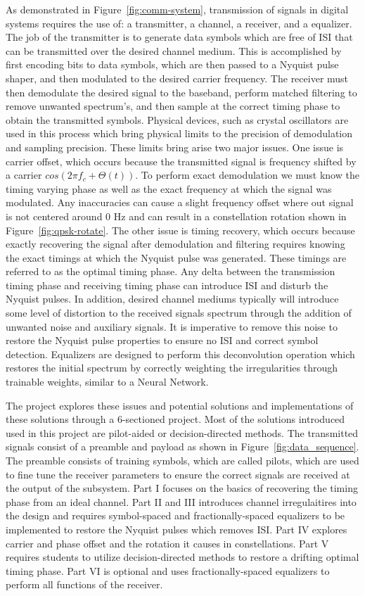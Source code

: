 As demonstrated in Figure~\ref{fig:comm-system}, transmission of signals in digital systems requires the use of: a transmitter, a channel, a receiver, and a equalizer. The job of the transmitter is to generate data symbols which are free of ISI that can be transmitted over the desired channel medium. This is accomplished by first encoding bits to data symbols, which are then passed to a Nyquist pulse shaper, and then modulated to the desired carrier frequency. The receiver must then demodulate the desired signal to the baseband, perform matched filtering to remove unwanted spectrum's, and then sample at the correct timing phase to obtain the transmitted symbols. Physical devices, such as crystal oscillators are used in this process which bring physical limits to the precision of demodulation and sampling precision. These limits bring arise two major issues. One issue is carrier offset, which occurs because the transmitted signal is frequency shifted by a carrier $cos(2\pi f_c + \Theta (t))$. To perform exact demodulation we must know the timing varying phase as well as the exact frequency at which the signal was modulated. Any inaccuracies can cause a slight frequency offset where out signal is not centered around 0 Hz and can result in a constellation rotation shown in Figure~\ref{fig:qpsk-rotate}. The other issue is timing recovery, which occurs because exactly recovering the signal after demodulation and filtering requires knowing the exact timings at which the Nyquist pulse was generated. These timings are referred to as the optimal timing phase. Any delta between the transmission timing phase and receiving timing phase can introduce ISI and disturb the Nyquist pulses.
In addition, desired channel mediums typically will introduce some level of distortion to the received signals spectrum through the addition of unwanted noise and auxiliary signals. It is imperative to remove this noise to restore the Nyquist pulse properties to ensure no ISI and correct symbol detection. Equalizers are designed to perform this deconvolution operation which restores the initial spectrum by correctly weighting the irregularities through trainable weights, similar to a Neural Network. 

The project explores these issues and potential solutions and implementations of these solutions through a 6-sectioned project. Most of the solutions introduced used in this project are pilot-aided or decision-directed methods. The transmitted signals consist of a preamble and payload as shown in Figure~\ref{fig:data_sequence}. The preamble consists of training symbols, which are called pilots, which are used to fine tune the receiver parameters to ensure the correct signals are received at the output of the subsystem. Part I focuses on the basics of recovering the timing phase from an ideal channel. Part II and III introduces channel irregulaitires into the design and requires symbol-spaced and fractionally-spaced equalizers to be implemented to restore the Nyquist pulses which removes ISI. Part IV explores carrier and phase offset and the rotation it causes in constellations. Part V requires students to utilize decision-directed methods to restore a drifting optimal timing phase. Part VI is optional and uses fractionally-spaced equalizers to perform all functions of the receiver.


